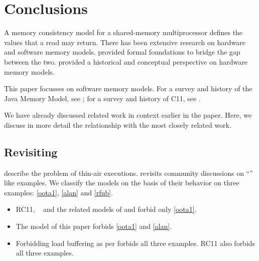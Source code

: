 


\section{Conclusions}
\label{sec:outro}

A memory consistency model for a shared-memory multiprocessor defines the
values that a read may return.  There has been extensive research on hardware
and software memory models. \citet{DBLP:journals/pacmpl/PodkopaevLV19}
provided formal foundations to bridge the gap between the two.
\citet{AlglaveThesis} provided a historical and conceptual perspective on
hardware memory models.

This paper focusses on software memory models.  For a survey and history of
the Java Memory Model, see \citep{DBLP:journals/toplas/Lochbihler13}; for a
survey and history of C11, see \citep{DBLP:phd/ethos/Batty15}.


We have already discussed related work in context earlier in the paper.
Here, we discuss in more detail the relationship with the most closely
related work.


\subsection{Revisiting \oota}
\citet{DBLP:conf/esop/BattyMNPS15} describe the problem of thin-air
executions. \citet{BoehmOOTA} revisits community discussions on ``\oota''
like examples.  We classify the models on the basis of their behavior on
three examples: \eqref{oota1}, \eqref{alan} and \eqref{rfub}.
\begin{itemize}
\item RC11\cite{DBLP:conf/pldi/LahavVKHD17}, \jmm\ 
  \cite{Manson:2005:JMM:1047659.1040336} and the related models of
  \citet{DBLP:conf/esop/JagadeesanPR10} and \citet{DBLP:conf/popl/KangHLVD17}
  forbid only \eqref{oota1}.
\item The model of this paper forbids \eqref{oota1} and \eqref{alan}.
\item Forbidding load buffering as per
  \citep{Dolan:2018:BDR:3192366.3192421,BoehmOOTA} forbids all three
  examples.  RC11\cite{DBLP:conf/pldi/LahavVKHD17} also forbids all three
  examples.
\end{itemize}

